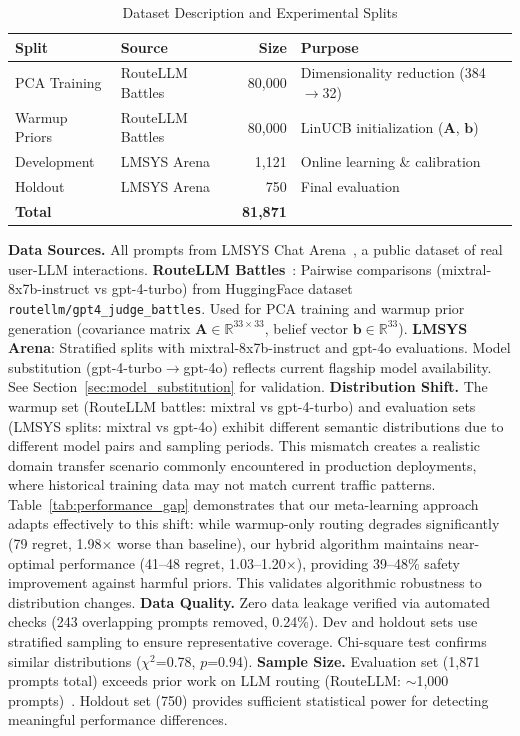 
\begin{table}[t]
\centering
\caption{Dataset Description and Experimental Splits}
\label{tab:dataset}
\small
\begin{tabular}{@{}llrl@{}}
\toprule
\textbf{Split} & \textbf{Source} & \textbf{Size} & \textbf{Purpose} \\
\midrule
PCA Training    & RouteLLM Battles & 80,000 & Dimensionality reduction (384$\rightarrow$32) \\
Warmup Priors   & RouteLLM Battles & 80,000 & LinUCB initialization ($\mathbf{A}$, $\mathbf{b}$) \\
Development     & LMSYS Arena      & 1,121 & Online learning \& calibration \\
Holdout         & LMSYS Arena      & 750 & Final evaluation \\
\midrule
\textbf{Total} & & \textbf{81,871} & \\
\bottomrule
\end{tabular}

\vspace{1em}
\footnotesize
\textbf{Data Sources.} All prompts from LMSYS Chat Arena~\cite{zheng2023lmsys}, a public dataset of real user-LLM interactions.
\textbf{RouteLLM Battles}~\cite{ong2024routellm}: Pairwise comparisons (mixtral-8x7b-instruct vs gpt-4-turbo) from HuggingFace dataset \texttt{routellm/gpt4\_judge\_battles}. Used for PCA training and warmup prior generation (covariance matrix $\mathbf{A} \in \mathbb{R}^{33 \times 33}$, belief vector $\mathbf{b} \in \mathbb{R}^{33}$).
\textbf{LMSYS Arena}: Stratified splits with mixtral-8x7b-instruct and gpt-4o evaluations. Model substitution (gpt-4-turbo$\rightarrow$gpt-4o) reflects current flagship model availability. See Section~\ref{sec:model_substitution} for validation.
\textbf{Distribution Shift.} The warmup set (RouteLLM battles: mixtral vs gpt-4-turbo) and evaluation sets (LMSYS splits: mixtral vs gpt-4o) exhibit different semantic distributions due to different model pairs and sampling periods. This mismatch creates a realistic domain transfer scenario commonly encountered in production deployments, where historical training data may not match current traffic patterns. Table~\ref{tab:performance_gap} demonstrates that our meta-learning approach adapts effectively to this shift: while warmup-only routing degrades significantly (79 regret, 1.98$\times$ worse than baseline), our hybrid algorithm maintains near-optimal performance (41--48 regret, 1.03--1.20$\times$), providing 39--48\% safety improvement against harmful priors. This validates algorithmic robustness to distribution changes.
\textbf{Data Quality.} Zero data leakage verified via automated checks (243 overlapping prompts removed, 0.24\%). Dev and holdout sets use stratified sampling to ensure representative coverage. Chi-square test confirms similar distributions ($\chi^2$=0.78, $p$=0.94).
\textbf{Sample Size.} Evaluation set (1,871 prompts total) exceeds prior work on LLM routing (RouteLLM: $\sim$1,000 prompts)~\cite{ong2024routellm}. Holdout set (750) provides sufficient statistical power for detecting meaningful performance differences.
\end{table}
